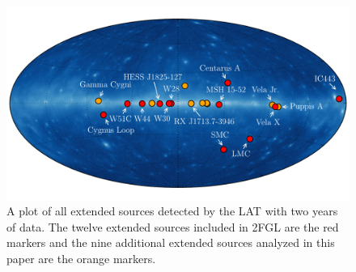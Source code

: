 \documentclass[12pt,preprint]{aastex}
\newcommand{\gev}{\text{GeV}\xspace}
\begin{document}
\clearpage
{\rotate
\begin{figure}
  \begin{center}
    \includegraphics{summary_plots/allsky_extended_sources.pdf}
    \end{center}
    \caption{A plot of all \gev extended sources detected by the LAT
    with two years of data.  The twelve extended sources included in
    2FGL are the red markers and the nine additional
    extended sources analyzed in this paper are the orange markers. 
    }\label{allsky_extended_sources}
  \end{figure}
  }
\end{document}

